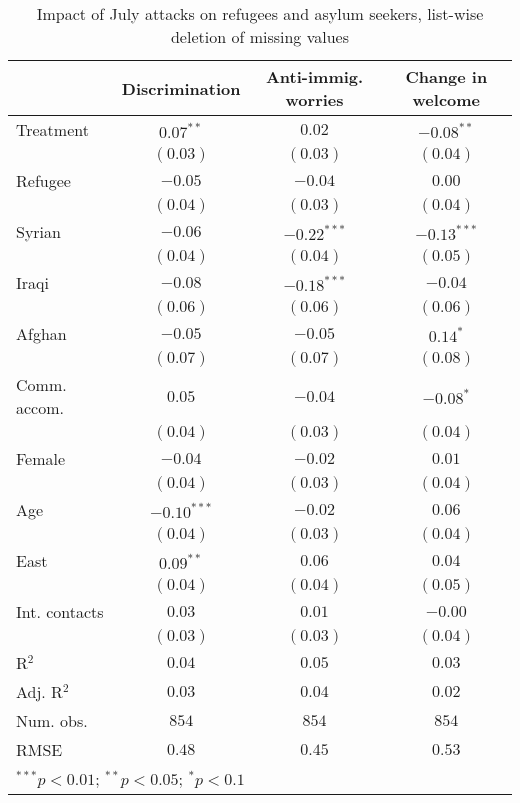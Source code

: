 
\begin{table}
\caption{Impact of July attacks on refugees and asylum seekers, list-wise deletion of missing values}
\begin{center}
\begin{tabular}{l c c c}
\toprule
 & Discrimination & Anti-immig. worries & Change in welcome \\
\midrule
Treatment     & $0.07^{**}$   & $0.02$        & $-0.08^{**}$  \\
              & $(0.03)$      & $(0.03)$      & $(0.04)$      \\
Refugee       & $-0.05$       & $-0.04$       & $0.00$        \\
              & $(0.04)$      & $(0.03)$      & $(0.04)$      \\
Syrian        & $-0.06$       & $-0.22^{***}$ & $-0.13^{***}$ \\
              & $(0.04)$      & $(0.04)$      & $(0.05)$      \\
Iraqi         & $-0.08$       & $-0.18^{***}$ & $-0.04$       \\
              & $(0.06)$      & $(0.06)$      & $(0.06)$      \\
Afghan        & $-0.05$       & $-0.05$       & $0.14^{*}$    \\
              & $(0.07)$      & $(0.07)$      & $(0.08)$      \\
Comm. accom.  & $0.05$        & $-0.04$       & $-0.08^{*}$   \\
              & $(0.04)$      & $(0.03)$      & $(0.04)$      \\
Female        & $-0.04$       & $-0.02$       & $0.01$        \\
              & $(0.04)$      & $(0.03)$      & $(0.04)$      \\
Age           & $-0.10^{***}$ & $-0.02$       & $0.06$        \\
              & $(0.04)$      & $(0.03)$      & $(0.04)$      \\
East          & $0.09^{**}$   & $0.06$        & $0.04$        \\
              & $(0.04)$      & $(0.04)$      & $(0.05)$      \\
Int. contacts & $0.03$        & $0.01$        & $-0.00$       \\
              & $(0.03)$      & $(0.03)$      & $(0.04)$      \\
\midrule
R$^2$         & $0.04$        & $0.05$        & $0.03$        \\
Adj. R$^2$    & $0.03$        & $0.04$        & $0.02$        \\
Num. obs.     & $854$         & $854$         & $854$         \\
RMSE          & $0.48$        & $0.45$        & $0.53$        \\
\bottomrule
\multicolumn{4}{l}{\scriptsize{$^{***}p<0.01$; $^{**}p<0.05$; $^{*}p<0.1$}}
\end{tabular}
\label{tab_host_na}
\end{center}
\end{table}
